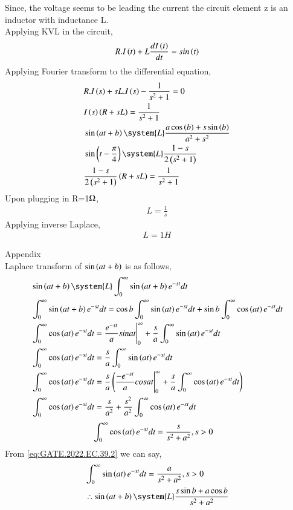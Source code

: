 \documentclass[journal,12pt,twocolumn]{IEEEtran}
\theoremstyle{remark}
\begin{document}
Since, the voltage seems to be leading the current the circuit element z is an inductor with inductance L.\\
Applying KVL in the circuit,
\begin{align}
    R.I\left(t\right)+L\frac{dI\left(t\right)}{dt}=sin\left(t\right)
\end{align}
Applying Fourier transform to the differential equation,
\begin{align}
    &R.I\brak{s}+sL.I\brak{s}-\frac{1}{s^2+1}=0\\
    &I\brak{s}\brak{R+sL}=\frac{1}{s^2+1}\\
    &\sin\brak{at+b}\system{L}\frac{a\cos\brak{b}+s\sin\brak{b}}{a^{2}+s^{2}}\\
    &\sin\brak{t-\frac{\pi}{4}}\system{L}\frac{1-s}{2\brak{s^2+1}}\\
    &\frac{1-s}{2\brak{s^2+1}}\brak{R+sL}=\frac{1}{s^2+1}
\end{align}
Upon plugging in R=1$\ohm$,
\begin{align}
   L=\frac{1}{s}
\end{align}
Applying inverse Laplace,
\begin{align}
    L=1H
\end{align}

Appendix\\
Laplace transform of $\sin\left(at+b\right)$ is as follows,
\begin{align}
    &\sin\brak{at+b}\system{L}\int_{0}^{\infty}\sin\brak{at+b}e^{-st}dt\\
    &\int_{0}^{\infty}\sin\brak{at+b}e^{-st}dt=\cos{b}\int_{0}^{\infty}\sin\brak{at}e^{-st}dt+\sin{b}\int_{0}^{\infty}\cos\brak{at}e^{-st}dt\\
    &\int_{0}^{\infty}\cos\brak{at}e^{-st}dt=\frac{e^{-st}}{a}sin{at}\Bigg|_{0}^{\infty}+\frac{s}{a}\int_{0}^{\infty}\sin\brak{at}e^{-st}dt\\
    &\int_{0}^{\infty}\cos\brak{at}e^{-st}dt=\frac{s}{a}\int_{0}^{\infty}\sin\brak{at}e^{-st}dt\label{eq:GATE.2022.EC.39.2}\\
    &\int_{0}^{\infty}\cos\brak{at}e^{-st}dt=\frac{s}{a}\brak{\frac{-e^{-st}}{a}cos{at}\Bigg|_{0}^{\infty}+\frac{s}{a}\int_{0}^{\infty}\cos\brak{at}e^{-st}dt}\\
    &\int_{0}^{\infty}\cos\brak{at}e^{-st}dt=\frac{s}{a^2}+\frac{s^2}{a^2}\int_{0}^{\infty}\cos\brak{at}e^{-st}dt
\end{align}
\begin{align}
    &\int_{0}^{\infty}\cos\left(at\right)e^{-st}dt=\frac{s}{s^2+a^2},s>0
\end{align}
From \eqref{eq:GATE.2022.EC.39.2} we can say,
\begin{align}
    &\int_{0}^{\infty}\sin\brak{at}e^{-st}dt=\frac{a}{s^2+a^2},s>0\\
    &\therefore \sin\brak{at+b}\system{L}\frac{s\sin{b}+a\cos{b}}{s^2+a^2}
\end{align}
\end{document}
